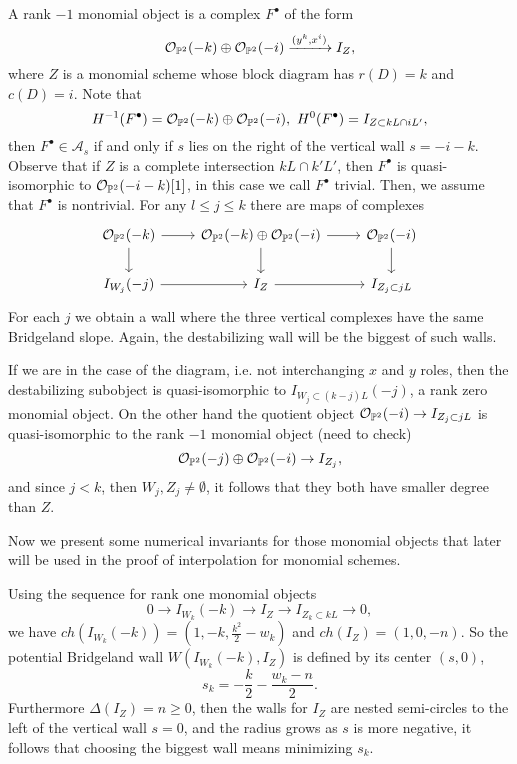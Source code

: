\documentclass[
	oldfontcommands,
	sumario=abnt-6027-2012,
	12pt,			%
	openright,		%
	oneside,		%
	a4paper,		%
	english,		%
	brazil			%
	]{imecc-unicamp}
\begin{document}
A rank $-1$ monomial object is a complex $F^\bullet$ of the form $$
{\mathcal O}_{{\mathbb P}^2}(-k)\oplus {\mathcal O}_{{\mathbb P}^2}(-i)\xrightarrow{(y^k,x^i)} I_Z,
$$
where $Z$ is a monomial scheme whose block diagram has $r(D)=k$ and $c(D)=i$. Note that
$$
H^{-1}(F^\bullet)={\mathcal O}_{{\mathbb P}^2}(-k)\oplus{\mathcal O}_{{\mathbb P}^2}(-i), ~H^0(F^\bullet)=I_{Z\subset kL\cap iL'},
$$
then $F^\bullet \in \mathcal A_s$ if and only if $s$ lies on the right of the vertical wall $s=-i-k$. Observe that if $Z$ is a complete intersection $kL\cap k'L'$, then $F^\bullet$ is quasi-isomorphic to ${\mathcal O}_{{\mathbb P}^2}(-i-k)[1]$, in this case we call $F^\bullet$ trivial. Then, we assume that $F^\bullet$ is nontrivial. For any $l\le j\le k$ there are maps of complexes $$
\begin{tikzcd}
\OO_{\PP^2}(-k) \arrow[r] \arrow[d] & \OO_{\PP^2}(-k)\oplus\OO_{\PP^2}(-i) \arrow[r] \arrow[d] & \OO_{\PP^2}(-i) \arrow[d] \\
I_{W_j}(-j) \arrow[r]               & I_Z \arrow[r]                                            & I_{Z_j\subset jL}        
\end{tikzcd}
$$
For each $j$ we obtain a wall where the three vertical complexes have the same Bridgeland slope. Again, the destabilizing wall will be the biggest of such walls.

If we are in the case of the diagram, i.e. not interchanging $x$ and $y$ roles, then the destabilizing subobject is quasi-isomorphic to $I_{W_j\subset(k-j)L}(-j)$, a rank zero monomial object. On the other hand the quotient object ${\mathcal O}_{{\mathbb P}^2}(-i)\rightarrow I_{Z_j\subset jL}$ is quasi-isomorphic to the rank $-1$ monomial object (need to check) $$
{\mathcal O}_{{\mathbb P}^2}(-j)\oplus {\mathcal O}_{{\mathbb P}^2}(-i)\rightarrow I_{Z_j},
$$
and since $j<k$, then $W_j,Z_j\neq \emptyset$, it follows that they both have smaller degree than $Z$.

Now we present some numerical invariants for those monomial objects that later will be used in the proof of interpolation for monomial schemes.

Using the sequence for rank one monomial objects $$
0\rightarrow I_{W_k}(-k)\rightarrow I_Z\rightarrow I_{Z_k\subset kL}\rightarrow 0,
$$
we have $ch(I_{W_k}(-k))=(1,-k,\frac{k^2}{2}-w_k)$ and $ch(I_Z)=(1,0,-n)$. So the potential Bridgeland wall $W(I_{W_k}(-k),I_Z)$ is defined by its center $(s,0)$, $$s_k=-\frac{k}{2}-\frac{w_k-n}{2}.$$ Furthermore $\Delta(I_Z)=n\geq 0$, then the walls for $I_Z$ are nested semi-circles to the left of the vertical wall $s=0$, and the radius grows as $s$ is more negative, it follows that choosing the biggest wall means minimizing $s_k$.   %
\end{document}

